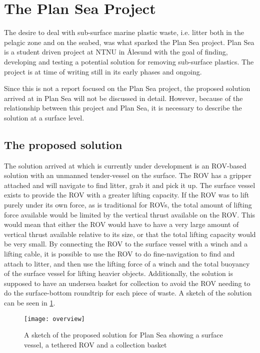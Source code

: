 \section{The Plan Sea Project}
The desire to deal with sub-surface marine plastic waste, i.e. litter both in the pelagic zone and on the seabed, was what sparked the Plan Sea project. Plan Sea is a student driven project at NTNU in Ålesund with the goal of finding, developing and testing a potential solution for removing sub-surface plastics. The project is at time of writing still in its early phases and ongoing. 

Since this is not a report focused on the Plan Sea project, the proposed solution arrived at in Plan Sea will not be discussed in detail. However, because of the relationship between this project and Plan Sea, it is necessary to describe the solution at a surface level. 

\subsection{The proposed solution}
The solution arrived at which is currently under development is an ROV-based solution with an unmanned tender-vessel on the surface. The ROV has a gripper attached and will navigate to find litter, grab it and pick it up. The surface vessel exists to provide the ROV with a greater lifting capacity. If the ROV was to lift purely under its own force, as is traditional for ROVs, the total amount of lifting force available would be limited by the vertical thrust available on the ROV. This would mean that either the ROV would have to have a very large amount of vertical thrust available relative to its size, or that the total lifting capacity would be very small. By connecting the ROV to the surface vessel with a winch and a lifting cable, it is possible to use the ROV to do fine-navigation to find and attach to litter, and then use the lifting force of a winch and the total buoyancy of the surface vessel for lifting heavier objects. Additionally, the solution is supposed to have an undersea basket for collection to avoid the ROV needing to do the surface-bottom roundtrip for each piece of waste. A sketch of the solution can be seen in \cref{fig:overview}.

\begin{figure}
	\centering
	\texttt{[image: overview]}
	\caption{A sketch of the proposed solution for Plan Sea showing a surface vessel, a tethered ROV and a collection basket}
	\label{fig:overview}
\end{figure}

